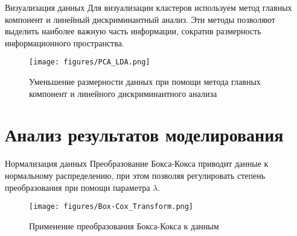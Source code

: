 \documentclass{beamer}
\begin{document}
\begin{frame}{Визуализация данных}
    Для визуализации кластеров используем метод главных компонент и линейный дискриминантный анализ. Эти методы позволяют выделить наиболее важную часть информации, сократив размерность информационного пространства.

    \begin{figure}
        \centering
        \texttt{[image: figures/PCA\_LDA.png]}
        \caption{Уменьшение размерности данных при помощи метода главных компонент и линейного дискриминантного анализа}
    \end{figure}
\end{frame}


\section{Анализ результатов моделирования}
\begin{frame}{Нормализация данных}
    Преобразование Бокса-Кокса приводит данные к нормальному распределению, при этом позволяя регулировать степень преобразования при помощи параметра $\lambda$.
    \begin{figure}
        \texttt{[image: figures/Box-Cox\_Transform.png]}
        \caption{Применение преобразования Бокса-Кокса к данным}
    \end{figure}
\end{frame}
\end{document}
